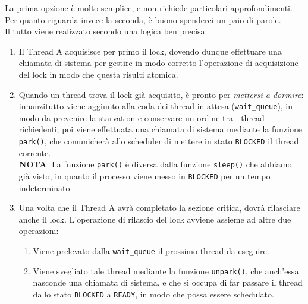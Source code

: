 \documentclass[12pt]{report}
\begin{document}
	La prima opzione è molto semplice, e non richiede particolari approfondimenti. Per quanto riguarda invece la seconda, è buono spenderci un paio di parole.\\
	Il tutto viene realizzato secondo una logica ben precisa:
	\begin{enumerate}
		\item Il Thread A acquisisce per primo il lock, dovendo dunque effettuare una chiamata di sistema per gestire in modo corretto l'operazione di acquisizione del lock in modo che questa risulti atomica.
		
		\item Quando un thread trova il lock già acquisito, è pronto per \textit{mettersi a dormire}: innanzitutto viene aggiunto alla coda dei thread in attesa (\texttt{wait\_queue}), in modo da prevenire la starvation e conservare un ordine tra i thread richiedenti; poi viene effettuata una chiamata di sistema mediante la funzione \texttt{park()}, che comunicherà allo scheduler di mettere in stato \texttt{BLOCKED} il thread corrente.\\
		\textbf{NOTA}: La funzione \texttt{park()} è diversa dalla funzione \texttt{sleep()} che abbiamo già visto, in quanto il processo viene messo in \texttt{BLOCKED} per un tempo indeterminato.
		
		\item Una volta che il Thread A avrà completato la sezione critica, dovrà rilasciare anche il lock. L'operazione di rilascio del lock avviene assieme ad altre due operazioni:
		\begin{enumerate}
			\item Viene prelevato dalla \texttt{wait\_queue} il prossimo thread da eseguire.
			
			\item Viene svegliato tale thread mediante la funzione \texttt{unpark()}, che anch'essa nasconde una chiamata di sistema, e che si occupa di far passare il thread dallo stato \texttt{BLOCKED} a \texttt{READY}, in modo che possa essere schedulato.
		\end{enumerate}
	\end{enumerate}
	
\end{document}
